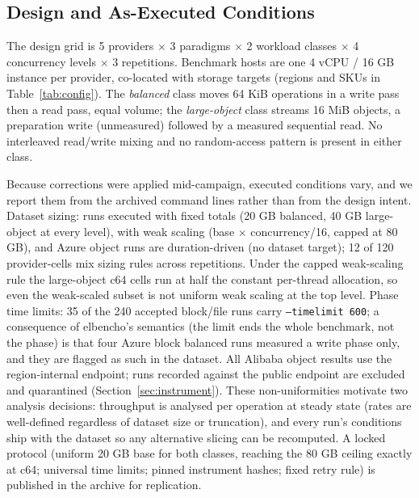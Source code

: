 \documentclass[manuscript,screen,review]{acmart}
\begin{document}
\subsection{Design and As-Executed Conditions}\label{sec:asexecuted}
The design grid is 5 providers $\times$ 3 paradigms $\times$ 2 workload
classes $\times$ 4 concurrency levels $\times$ 3 repetitions. Benchmark hosts
are one 4 vCPU / 16 GB instance per provider, co-located with storage targets
(regions and SKUs in Table~\ref{tab:config}). The \emph{balanced} class moves
64 KiB operations in a write pass then a read pass, equal volume; the
\emph{large-object} class streams 16 MiB objects, a preparation write
(unmeasured) followed by a measured sequential read. No interleaved
read/write mixing and no random-access pattern is present in either class.

Because corrections were applied mid-campaign, executed conditions vary, and
we report them from the archived command lines rather than from the design
intent. Dataset sizing: \designFixed{} runs executed with fixed totals (20 GB balanced,
40 GB large-object at every level), \designScaled{} with weak scaling (base $\times$
concurrency/16, capped at 80 GB), and \designOther{} Azure object runs are duration-driven
(no dataset target); 12 of 120 provider-cells mix sizing rules across
repetitions. Under the capped weak-scaling rule the large-object c64 cells run
at half the constant per-thread allocation, so even the weak-scaled subset is
not uniform weak scaling at the top level. Phase time limits: 35 of the 240
accepted block/file runs carry \texttt{--timelimit 600}; a consequence of elbencho's
semantics (the limit ends the whole benchmark, not the phase) is that four
Azure block balanced runs measured a write phase only, and they are flagged
as such in the dataset. All Alibaba object results use the region-internal
endpoint; runs recorded against the public endpoint are excluded and
quarantined (Section~\ref{sec:instrument}). These non-uniformities motivate
two analysis decisions: throughput is analysed per operation at steady state
(rates are well-defined regardless of dataset size or truncation), and every
run's conditions ship with the dataset so any alternative slicing can be
recomputed. A locked protocol (uniform 20 GB base for both classes, reaching
the 80 GB ceiling exactly at c64; universal time limits; pinned instrument
hashes; fixed retry rule) is published in the archive for replication.

\begin{table}
\caption{Attempts versus accepted runs per provider. Failures are dominated
by provisioning-level interactions (object-store bucket lifecycle on Alibaba;
endpoint and runner corrections on Azure and GCP), not by measurement
variability. All attempts are preserved in the archived manifests. Retry rule
as executed: failed runs were re-attempted until accepted or until the
underlying defect was diagnosed and corrected; the locked replication
protocol fixes a maximum of two retries.}
\label{tab:attempts}

\end{table}
\end{document}
